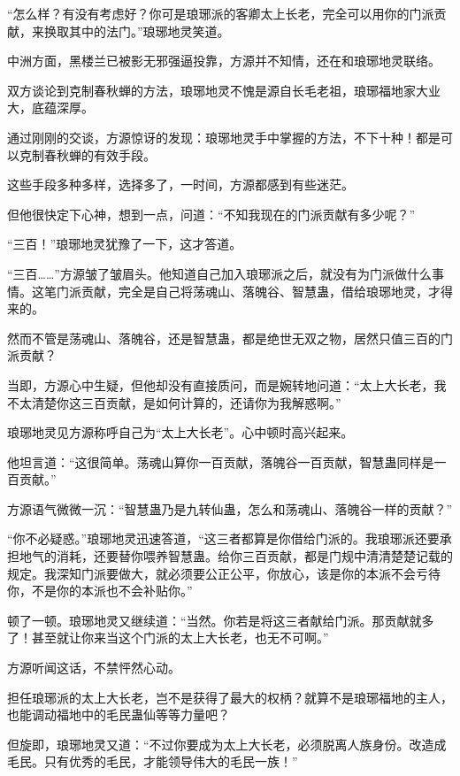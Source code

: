 
\begin{this_body}



“怎么样？有没有考虑好？你可是琅琊派的客卿太上长老，完全可以用你的门派贡献，来换取其中的法门。”琅琊地灵笑道。

中洲方面，黑楼兰已被影无邪强逼投靠，方源并不知情，还在和琅琊地灵联络。

双方谈论到克制春秋蝉的方法，琅琊地灵不愧是源自长毛老祖，琅琊福地家大业大，底蕴深厚。

通过刚刚的交谈，方源惊讶的发现：琅琊地灵手中掌握的方法，不下十种！都是可以克制春秋蝉的有效手段。

这些手段多种多样，选择多了，一时间，方源都感到有些迷茫。

但他很快定下心神，想到一点，问道：“不知我现在的门派贡献有多少呢？”

“三百！”琅琊地灵犹豫了一下，这才答道。

“三百……”方源皱了皱眉头。他知道自己加入琅琊派之后，就没有为门派做什么事情。这笔门派贡献，完全是自己将荡魂山、落魄谷、智慧蛊，借给琅琊地灵，才得来的。

然而不管是荡魂山、落魄谷，还是智慧蛊，都是绝世无双之物，居然只值三百的门派贡献？

当即，方源心中生疑，但他却没有直接质问，而是婉转地问道：“太上大长老，我不太清楚你这三百贡献，是如何计算的，还请你为我解惑啊。”

琅琊地灵见方源称呼自己为“太上大长老”。心中顿时高兴起来。

他坦言道：“这很简单。荡魂山算你一百贡献，落魄谷一百贡献，智慧蛊同样是一百贡献。”

方源语气微微一沉：“智慧蛊乃是九转仙蛊，怎么和荡魂山、落魄谷一样的贡献？”

“你不必疑惑。”琅琊地灵迅速答道，“这三者都算是你借给门派的。我琅琊派还要承担地气的消耗，还要替你喂养智慧蛊。给你三百贡献，都是门规中清清楚楚记载的规定。我深知门派要做大，就必须要公正公平，你放心，该是你的本派不会亏待你，不是你的本派也不会补贴你。”

顿了一顿。琅琊地灵又继续道：“当然。你若是将这三者献给门派。那贡献就多了！甚至就让你来当这个门派的太上大长老，也无不可啊。”

方源听闻这话，不禁怦然心动。

担任琅琊派的太上大长老，岂不是获得了最大的权柄？就算不是琅琊福地的主人，也能调动福地中的毛民蛊仙等等力量吧？

但旋即，琅琊地灵又道：“不过你要成为太上大长老，必须脱离人族身份。改造成毛民。只有优秀的毛民，才能领导伟大的毛民一族！”


\end{this_body}
